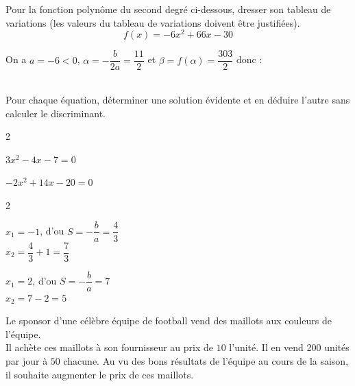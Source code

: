 \documentclass[12pt,a4paper]{article}  %
\begin{document}
\newpage
\vspace{-0.3cm}
Pour la fonction polynôme du second degré ci-dessous, dresser son tableau de variations (les valeurs du tableau de variations doivent être justifiées).
$$f(x)=-6x^2+66x-30$$
\begin{corrBox}
    On a $a=-6<0$, $\alpha=-\dfrac{b}{2a}=\dfrac{11}{2}$ et $\beta=f(\alpha)=\dfrac{303}{2}$ donc :\\
    \ \\
\end{corrBox}

\vspace{-0.3cm}

Pour chaque équation, déterminer une solution évidente et en déduire l'autre sans calculer le discriminant.
\begin{multicols}{2}
\begin{enumMet}
    \item $3x^2-4x-7=0$
    \item $-2x^2+14x-20=0$
\end{enumMet}
\end{multicols}

\begin{corrBox}
    \begin{multicols}{2}
        \begin{enumMet}
            \item $x_1=-1$, d'ou $S=-\dfrac{b}{a}=\dfrac{4}{3}$\\
            $x_2=\dfrac{4}{3}+1=\dfrac{7}{3}$
            \item $x_1=2$, d'ou $S=-\dfrac{b}{a}=7$\\
            $x_2=7-2=5$
        \end{enumMet}
    \end{multicols}
\end{corrBox}

\newpage
{}

Le sponsor d'une célèbre équipe de football vend des maillots aux couleurs de l'équipe.\\

Il achète ces maillots à son fournisseur au prix de $10$ \EUR{} l'unité. Il en vend 200 unités par jour à $50$ \EUR{} chacune. Au vu des bons résultats de l'équipe au cours de la saison, il souhaite augmenter le prix de ces maillots.\\
\end{document}
